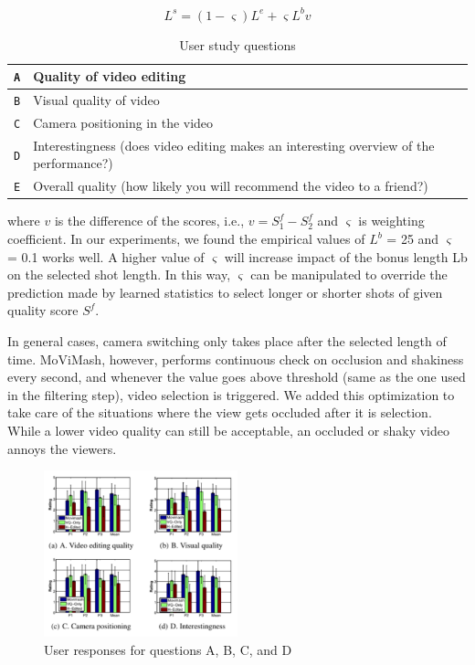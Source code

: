 \documentclass{sig-alternate}
\begin{document}
\begin{equation}
    L^s = (1 - \varsigma)L^e + \varsigma L^bv
\end{equation}
\begin{table}
	\caption{User study questions}
	\begin{tabular}{L{1cm}|L{7cm}} \hline
		\texttt A&Quality of video editing \\ \hline 
		\texttt B&Visual quality of video \\ \hline 
		\texttt C&Camera positioning in the video  \\ \hline
		\texttt D&Interestingness (does video editing makes an interesting overview of the performance?)\\ \hline
		\texttt E&Overall quality (how likely you will recommend the video to a friend?) \\ \hline
		
	\end{tabular}
\end{table}
where $v$ is the difference of the scores, i.e., $v = S^f_1 -S^f_2$ and $\varsigma$ is weighting coefficient. In our experiments, we found the empirical
values of $L^b$ = 25 and $\varsigma$ = 0.1 works well. A higher value of
$\varsigma$ will increase impact of the bonus length Lb on the selected shot
length. In this way, $\varsigma$ can be manipulated to override the prediction
made by learned statistics to select longer or shorter shots of given
quality score $S^f$.

In general cases, camera switching only takes place after the selected length of time. MoViMash, however, performs continuous check on occlusion and shakiness every second, and whenever the
value goes above threshold (same as the one used in the filtering
step), video selection is triggered. We added this optimization to
take care of the situations where the view gets occluded after it is
selection. While a lower video quality can still be acceptable, an
occluded or shaky video annoys the viewers.

\begin{figure}[h]
    \includegraphics[width=0.5\textwidth]{img7.png}
    \caption{User responses for questions A, B, C, and D}
    \label{fig:mesh7}
\end{figure}
\end{document}
